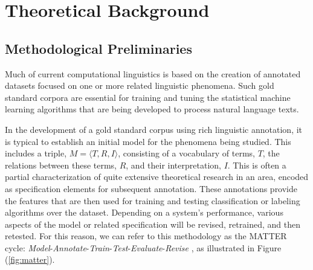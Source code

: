\documentclass[10pt]{article}
\begin{document}


\section{Theoretical Background}

\subsection{Methodological Preliminaries}

Much of current computational linguistics is based on the creation of annotated datasets focused on one or more related linguistic phenomena. Such gold standard corpora are essential for  training and tuning the statistical machine learning algorithms that are being developed to process  natural language texts. 

In the development of a gold standard corpus using rich linguistic annotation, it is typical to establish an initial model for the phenomena being studied. This  includes a triple, $M = \langle T,R,I \rangle$, consisting of a
vocabulary of terms, $T$, the relations between these terms, $R$, and their interpretation,
$I$. This is often a partial  characterization of quite extensive theoretical research in an area, encoded as specification elements for subsequent annotation. These annotations provide the features that are then used for training and testing classification or labeling algorithms over the dataset. Depending on a system's performance, various aspects of the model or related specification will be revised, retrained, and then retested. 
For this reason, we can refer to this methodology as the MATTER cycle: {\it Model}-{\it Annotate}-{\it Train}-{\it Test}-{\it Evaluate}-{\it Revise}  \cite{pustejovsky2012natural}, as illustrated in Figure (\ref{fig:matter}). 
\end{document}
